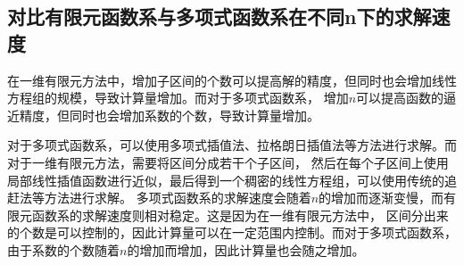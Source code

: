 \documentclass[12pt, a4paper, oneside]{ctexart}
\begin{document}
\begin{spacing}{2.0}
\section{对比有限元函数系与多项式函数系在不同n下的求解速度}

在一维有限元方法中，增加子区间的个数可以提高解的精度，但同时也会增加线性方程组的规模，导致计算量增加。而对于多项式函数系，
增加$n$可以提高函数的逼近精度，但同时也会增加系数的个数，导致计算量增加。

对于多项式函数系，可以使用多项式插值法、拉格朗日插值法等方法进行求解。而对于一维有限元方法，需要将区间分成若干个子区间，
然后在每个子区间上使用局部线性插值函数进行近似，最后得到一个稠密的线性方程组，可以使用传统的追赶法等方法进行求解。
多项式函数系的求解速度会随着$n$的增加而逐渐变慢，而有限元函数系的求解速度则相对稳定。这是因为在一维有限元方法中，
区间分出来的个数是可以控制的，因此计算量可以在一定范围内控制。而对于多项式函数系，由于系数的个数随着$n$的增加而增加，因此计算量也会随之增加。

\end{spacing}{}
\end{document}
